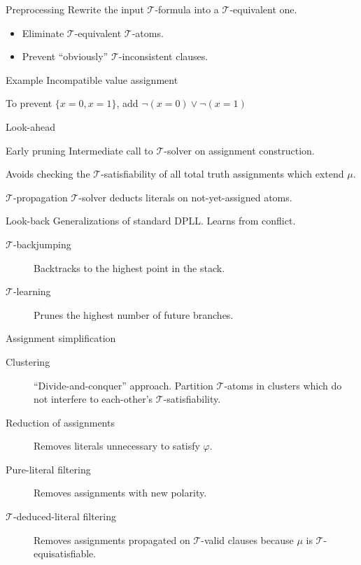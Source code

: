 \documentclass{beamer}
\begin{document}
\begin{frame}{Preprocessing}
  Rewrite the input $\mathcal{T}$-formula into a $\mathcal{T}$-equivalent one.

  \begin{itemize}
    \item Eliminate $\mathcal{T}$-equivalent $\mathcal{T}$-atoms.
    \item Prevent ``obviously'' $\mathcal{T}$-inconsistent clauses.
  \end{itemize}

  \begin{exampleblock}{Example}
    Incompatible value assignment

    To prevent $\{x=0, x=1\}$, add $\neg (x=0) \lor \neg (x=1)$
  \end{exampleblock}
\end{frame}

\begin{frame}{Look-ahead}
  \begin{block}{Early pruning}
    Intermediate call to $\mathcal{T}$-solver on assignment construction.

    Avoids checking the $\mathcal{T}$-satisfiability of all total truth assignments which extend $\mu$.
  \end{block}
  \begin{block}{$\mathcal{T}$-propagation}
    $\mathcal{T}$-solver deducts literals on not-yet-assigned atoms.
  \end{block}
\end{frame}

\begin{frame}{Look-back}
  Generalizations of standard DPLL. Learns from conflict.
  \begin{description}
    \item[$\mathcal{T}$-backjumping] Backtracks to the highest point in the stack.
    \item[$\mathcal{T}$-learning] Prunes the highest number of future branches.
  \end{description}
\end{frame}


\begin{frame}{Assignment simplification}
  \begin{description}
    \item[Clustering] ``Divide-and-conquer'' approach. Partition $\mathcal{T}$-atoms in clusters which do not interfere to each-other's $\mathcal{T}$-satisfiability.
    \item[Reduction of assignments] Removes literals unnecessary to satisfy $\varphi$.
    \item[Pure-literal filtering] Removes assignments with new polarity.
    \item[$\mathcal{T}$-deduced-literal filtering] Removes assignments propagated on $\mathcal{T}$-valid clauses because $\mu$ is $\mathcal{T}$-equisatisfiable.
  \end{description}
\end{frame}
\end{document}
